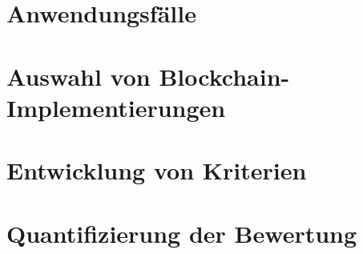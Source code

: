 \documentclass[german,12pt,paper=a4,DIV=calc,twoside, openright]{scrreprt}
\begin{document}


 \newpage
\cleardoublepage 


\tableofcontents
\cleardoublepage 

\printglossary[style=altlist,title=Glossar]
\clearpage 
 
\printglossary[type=\acronymtype,style=long]
 







\newpage

\chapter{Anwendungsfälle}



\chapter{Auswahl von Blockchain-Implementierungen}



\chapter{Entwicklung von Kriterien}


\chapter{Quantifizierung der Bewertung}
\end{document}
